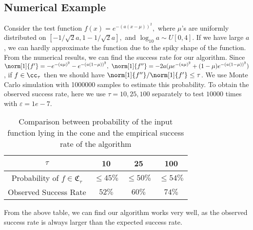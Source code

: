 \subsection{Numerical Example}
Consider the test function $f(x)=e^{-(a(x-\mu))^2},$
where $\mu$'s are uniformly distributed on $[-1/\sqrt{2}a,1-1/\sqrt{2}a],$ and $\log_{10} a \sim U[0,4].$
If we have large $a$, we can hardly approximate the function due to the spiky shape of the function. From the numerical results, we can find the success rate for our algorithm. Since $\norm[1]{f'}=-e^{-(a\mu)^2}-e^{-(a(1-\mu))^2}, \ \norm[1]{f''}=-2a(\mu e^{-(a\mu)^2}+(1-\mu)e^{-(a(1-\mu))^2})$, if $f \in \cc_{\tau}$ then we should have
$\norm[1]{f''}/\norm[1]{f'} \leq \tau$. We use Monte Carlo simulation with 1000000 samples to estimate this probability. To obtain the observed success rate, here we use $\tau = 10, 25 , 100$ separately to test $10000$ times with $\varepsilon = 1e-7$.
\begin{table}[h]
\centering
\begin{tabular}{cccc}
$\tau$ &  10 & 25 & 100\\
\toprule
Probability of $f \in \mathfrak{C}_{\tau}$ &  $\leq 45 \%$ &  $\leq 50 \%$  & $\leq 54 \%$ \\
Observed Success Rate & $52\%$ &  $60\%$  & $74\%$ \\
\end{tabular}
\caption{ Comparison between probability of the input function lying in the cone and the empirical success rate of the algorithm}
\end{table}

From the above table, we can find our algorithm works very well, as the observed
success rate is always larger than the expected success rate.
